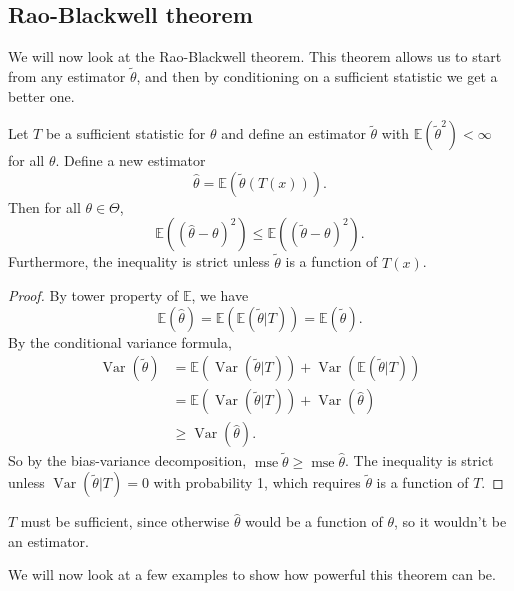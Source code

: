 \documentclass[a4paper]{scrartcl}
\begin{document}
\subsection{Rao-Blackwell theorem}
We will now look at the Rao-Blackwell theorem. This theorem allows us to start from any estimator $\widetilde{\theta}$, and then by conditioning on a sufficient statistic we get a better one.
\begin{theorem}
      Let $T$ be a sufficient statistic for $\theta$ and define an estimator $\widetilde{\theta}$ with $\mathbb{E}(\widetilde{\theta}^2)< \infty$ for all $\theta$. Define a new estimator \[
      \hat{\theta}=\mathbb{E} (\widetilde{\theta} (T (x)))
      .\] Then for all $\theta \in \Theta$, \[
      \mathbb{E}((\hat{\theta}-\theta)^2) \leq \mathbb{E} ((\widetilde{\theta}-\theta)^2)
      .\] Furthermore, the inequality is strict unless $\widetilde{\theta}$ is a function of $T (x)$.
\end{theorem}
\begin{proof}
      By tower property of $\mathbb{E}$, we have \[
      \mathbb{E}(\hat{\theta})=\mathbb{E}(\mathbb{E}(\widetilde{\theta}|T))=\mathbb{E}(\widetilde{\theta})
      .\] By the conditional variance formula, 
      \begin{align*}
          \operatorname{Var}(\widetilde{\theta})&=\mathbb{E}(\operatorname{Var}(\widetilde{\theta}|T))+\operatorname{Var}(\mathbb{E}(\widetilde{\theta}|T))\\
          &=\mathbb{E}(\operatorname{Var}(\widetilde{\theta}|T))+\operatorname{Var}(\hat{\theta})\\
          &\geq \operatorname{Var}(\hat{\theta}).
      \end{align*}
      So by the bias-variance decomposition, $\operatorname{mse} \widetilde{\theta}\geq \operatorname{mse}\hat{\theta}$. The inequality is strict unless $\operatorname{Var}(\widetilde{\theta}|T)=0$ with probability 1, which requires $\widetilde{\theta}$ is a function of $T$.
\end{proof}
\begin{remark}
      $T$ must be sufficient, since otherwise $\hat{\theta}$ would be a function of $\theta$, so it wouldn't be an estimator.
\end{remark}
We will now look at a few examples to show how powerful this theorem can be.
\end{document}

